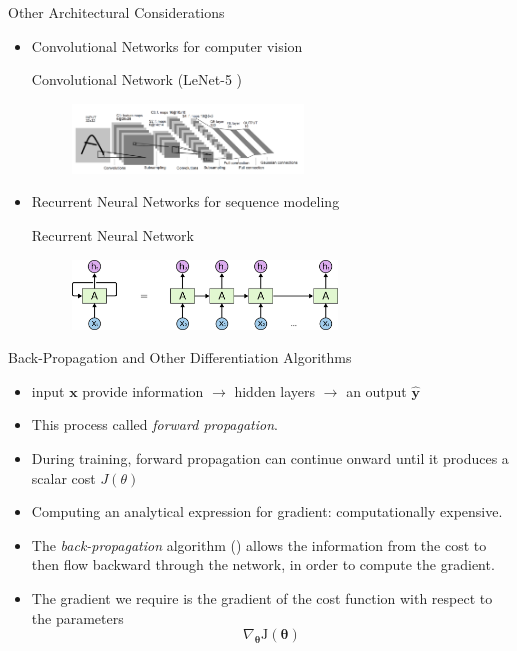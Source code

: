 \documentclass[10pt]{beamer}
\begin{document}
	\begin{frame}{Other Architectural Considerations}
		\begin{itemize}
			\item Convolutional Networks for computer vision
			\begin{exampleblock}{Convolutional Network (LeNet-5 \cite{lecun1998gradient})}
				\begin{figure}
					\includegraphics[height=5em]{figures/lenet-5.png}
				\end{figure}
			\end{exampleblock}
			\item Recurrent Neural Networks for sequence modeling
			\begin{exampleblock}{Recurrent Neural Network}
				\begin{figure}
					\includegraphics[height=5em]{figures/RNN-unrolled.png}
				\end{figure}
			\end{exampleblock}
		\end{itemize}
	\end{frame}

	\begin{frame}{Back-Propagation and Other Differentiation Algorithms}
		\begin{itemize}
			\pause
			\item input $\bm{x}$ provide information $\rightarrow$ hidden layers $\rightarrow$ an output $\hat{\bm{y}}$
			\pause
			\item This process called \emph{forward propagation}.
			\pause
			\item During training, forward propagation can continue onward until it produces a scalar cost $J(\theta)$
			\pause
			\item Computing an analytical expression for gradient: computationally expensive.
			\pause
			\item The \emph{back-propagation} algorithm (\citet{williams1986learning}) allows the information from the cost to then flow backward through the network, in order to compute the gradient.
			\pause
			\item The gradient we require is the gradient of the cost function with respect to the parameters
			$$\nabla_{\bm{\theta}} \mathrm{J}(\bm{\theta})$$
		\end{itemize}
	\end{frame}
\end{document}
